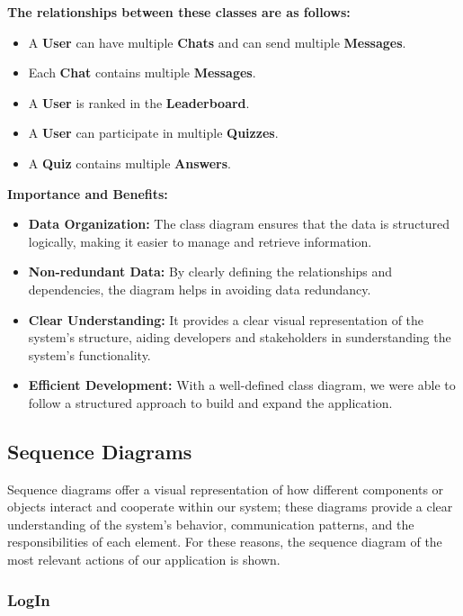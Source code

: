 \textbf{The relationships between these classes are as follows:}

\begin{itemize}
    \item A \textbf{User} can have multiple \textbf{Chats} and can send multiple \textbf{Messages}.
    \item Each \textbf{Chat} contains multiple \textbf{Messages}.
    \item A \textbf{User} is ranked in the \textbf{Leaderboard}.
    \item A \textbf{User} can participate in multiple \textbf{Quizzes}.
    \item A \textbf{Quiz} contains multiple \textbf{Answers}.
\end{itemize}

\textbf{Importance and Benefits:}
\begin{itemize}
    \item \textbf{Data Organization:} The class diagram ensures that the data is structured logically, making it easier to manage and retrieve information.
    \item \textbf{Non-redundant Data:} By clearly defining the relationships and dependencies, the diagram helps in avoiding data redundancy.
    \item \textbf{Clear Understanding:} It provides a clear visual representation of the system's structure, aiding developers and stakeholders in sunderstanding the system's functionality.
    \item \textbf{Efficient Development:} With a well-defined class diagram, we were able to follow a structured approach to build and expand the application.
\end{itemize}

\subsection{Sequence Diagrams}

Sequence diagrams offer a visual representation of how different components or objects interact and cooperate within our system; these diagrams provide a clear understanding of the system's behavior, communication patterns, and the responsibilities of each element. For these reasons, the sequence diagram of the most relevant actions of our application is shown.

\subsubsection{LogIn}

